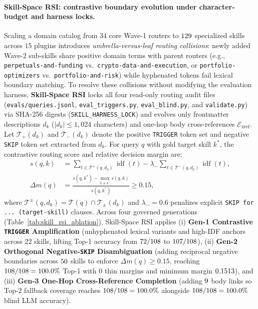 \paragraph{Skill-Space RSI: contrastive boundary evolution under character-budget and harness locks.}
Scaling a domain catalog from $34$ core Wave-1 routers to $129{}$ specialized skills across $15$ plugins introduces \emph{umbrella-versus-leaf routing collisions}: newly added Wave-2 sub-skills share positive domain terms with parent routers (e.g., \texttt{perpetuals-and-funding} vs.\ \texttt{crypto-data-and-execution}, or \texttt{portfolio-optimizers} vs.\ \texttt{portfolio-and-risk}) while hyphenated tokens fail lexical boundary matching. To resolve these collisions without modifying the evaluation harness, \textbf{Skill-Space RSI} locks all four read-only routing audit files (\texttt{evals/queries.jsonl}, \texttt{eval\_triggers.py}, \texttt{eval\_blind.py}, and \texttt{validate.py}) via SHA-256 digests (\texttt{SKILL\_HARNESS\_LOCK}) and evolves only frontmatter descriptions $d_k$ ($|d_k| \le 1{,}024$ characters) and one-hop body cross-references $\mathcal{E}_{\text{xref}}$. Let $\mathcal{T}_{+}(d_k)$ and $\mathcal{T}_{-}(d_k)$ denote the positive \texttt{TRIGGER} token set and negative \texttt{SKIP} token set extracted from $d_k$. For query $q$ with gold target skill $k^*$, the contrastive routing score and relative decision margin are:
\begin{equation}
\begin{aligned}
s(q, k) &= \sum_{t \in \mathcal{T}^{+}(q, d_k)} \operatorname{idf}(t) - \lambda_{-} \!\! \sum_{t \in \mathcal{T}^{-}(q, d_k)} \operatorname{idf}(t), \\
\Delta m(q) &= \frac{s(q, k^*) - \max_{k \neq k^*} s(q, k)}{s(q, k^*)} \ge 0.15,
\end{aligned}
\label{eq:skill_rsi_margin}
\end{equation}
where $\mathcal{T}^{\pm}(q, d_k) = \mathcal{T}(q) \cap \mathcal{T}_{\pm}(d_k)$ and $\lambda_{-} = 0.6$ penalizes explicit \texttt{SKIP for ... (target-skill)} clauses. Across four governed generations (Table~\ref{tab:skill_rsi_ablation}), Skill-Space RSI applies (i) \textbf{Gen-1 Contrastive \texttt{TRIGGER} Amplification} (unhyphenated lexical variants and high-IDF anchors across $22$ skills, lifting Top-1 accuracy from $72{}/108$ to $107{}/108$), (ii) \textbf{Gen-2 Orthogonal Negative-\texttt{SKIP} Disambiguation} (adding reciprocal negative boundaries across $50{}$ skills to enforce $\Delta m(q) \ge 0.15$, reaching $108{}/108 = 100.0{}\%$ Top-1 with $0$ thin margins and minimum margin $0.1513{}$), and (iii) \textbf{Gen-3 One-Hop Cross-Reference Completion} (adding $9{}$ body links so Top-2 fallback coverage reaches $108{}/108 = 100.0\%$ alongside $108{}/108 = 100.0\%$ blind LLM accuracy).

